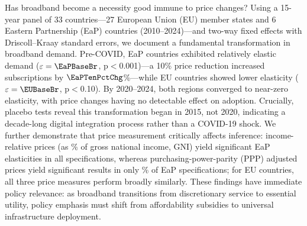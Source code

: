 Has broadband become a necessity good immune to price changes? Using a 15-year panel of 33 countries---27 European Union (EU) member states and 6 Eastern Partnership (EaP) countries (2010--2024)---and two-way fixed effects with Driscoll--Kraay standard errors, we document a fundamental transformation in broadband demand. Pre-COVID, EaP countries exhibited relatively elastic demand ($\varepsilon = \EaPBaseBr$, p$<$0.001)---a 10\% price reduction increased subscriptions by $\EaPTenPctChg$\%---while EU countries showed lower elasticity ($\varepsilon = \EUBaseBr$, p$<$0.10). By 2020--2024, both regions converged to near-zero elasticity, with price changes having no detectable effect on adoption. Crucially, placebo tests reveal this transformation began in 2015, not 2020, indicating a decade-long digital integration process rather than a COVID-19 shock. We further demonstrate that price measurement critically affects inference: income-relative prices (as \% of gross national income, GNI) yield significant EaP elasticities in all specifications, whereas purchasing-power-parity (PPP) adjusted prices yield significant results in only \PctPPPSigEaP\% of EaP specifications; for EU countries, all three price measures perform broadly similarly. These findings have immediate policy relevance: as broadband transitions from discretionary service to essential utility, policy emphasis must shift from affordability subsidies to universal infrastructure deployment.
